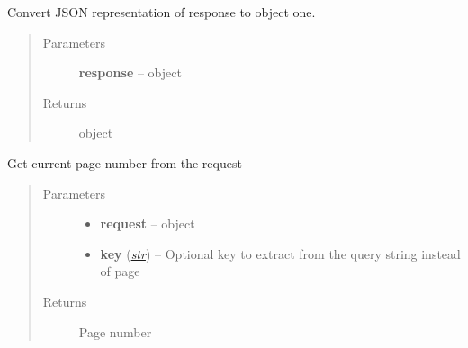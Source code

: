 \documentclass[letterpaper,10pt,english]{sphinxmanual}
\begin{document}

\begin{fulllineitems}
\label{web_portal:core.courses.utils.json_object_hook}
Convert JSON representation of response to object one.
\begin{quote}\begin{description}
\item[{Parameters}] \leavevmode
\textbf{response} --  object

\item[{Returns}] \leavevmode
{} object

\end{description}\end{quote}

\end{fulllineitems}


\begin{fulllineitems}
\label{web_portal:core.courses.utils.get_page_from_request}
Get current page number from the request
\begin{quote}\begin{description}
\item[{Parameters}] \leavevmode\begin{itemize}
\item {} 
\textbf{request} --  object

\item {} 
\textbf{key} (\href{http://docs.python.org/library/functions.html\#str}{\emph{str}}) -- Optional key to extract from the query string instead of page

\end{itemize}

\item[{Returns}] \leavevmode
Page number

\end{description}\end{quote}

\end{fulllineitems}

\end{document}
